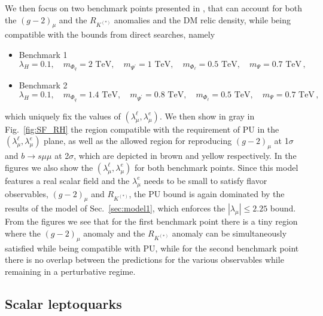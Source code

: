 \documentclass[a4paper,11pt]{article}
\begin{document}
We then focus on two benchmark points presented in \cite{Arcadi:2021cwg}, that can account for both the $(g-2)_\mu$ and the $R_{K^{(*)}}$ anomalies and the DM relic density, while being compatible with the bounds from direct searches, namely
\begin{itemize}
\item Benchmark 1
\begin{equation}
\lambda_H=0.1,\quad  m_{\Phi_q}=2\text{ TeV},\quad m_{\Psi^\prime}=1\text{ TeV},\quad m_{\Phi_\ell}=0.5\text{ TeV},\quad m_{\Psi}=0.7\text{ TeV}\,,
\end{equation}
\item Benchmark 2
\begin{equation}
\lambda_H=0.1,\quad  m_{\Phi_q}=1.4\text{ TeV},\quad m_{\Psi^\prime}=0.8\text{ TeV},\quad m_{\Phi_\ell}=0.5\text{ TeV},\quad m_{\Psi}=0.7\text{ TeV}\, , 
\end{equation}
\end{itemize}
which uniquely fix the values of  $(\lambda^\ell_\mu,\lambda^e_\mu)$. We then show in gray in Fig.~\ref{fig:SF_RH} the region compatible with the requirement of PU in the $(\lambda^\ell_\mu,\lambda^e_\mu)$ plane, as well as the allowed region for reproducing $(g-2)_\mu$ at 1$\sigma$ and $b\to s\mu\mu$ at 2$\sigma$, which are depicted in brown and yellow respectively. In the figures we also show the $(\lambda^\ell_\mu,\lambda^e_\mu)$ for both benchmark points.
Since this model features a real scalar field and the $\lambda^e_\mu$ needs to be small to satisfy flavor observables, $(g-2)_\mu$ and  $R_{K^{(*)}}$, the PU bound is again dominated  by the results of the model of Sec.~\ref{sec:model1}, which enforces the $|\lambda_\mu| \leq {2.25}$ bound.
From the figures we see that for the first benchmark point there is a tiny region where the $(g-2)_\mu$ anomaly and the $R_{K^{(*)}}$ anomaly can be simultaneously satisfied while being compatible with PU, while for the second benchmark point there is no overlap between the predictions for the various observables while remaining in a perturbative regime.  



\subsection{Scalar leptoquarks}
\end{document}
